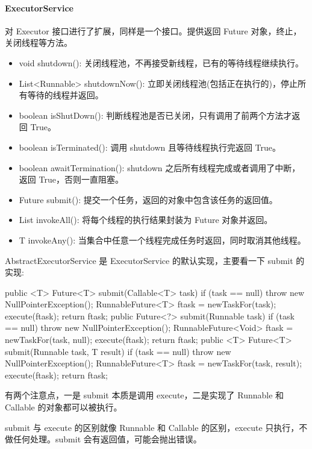 \paragraph*{ExecutorService} 对 Executor 接口进行了扩展，同样是一个接口。提供返回 Future 对象，终止，关闭线程等方法。

\begin{itemize}
    \item void shutdown(): 关闭线程池，不再接受新线程，已有的等待线程继续执行。
    \item List<Runnable> shutdownNow(): 立即关闭线程池(包括正在执行的)，停止所有等待的线程并返回。
    \item boolean isShutDown(): 判断线程池是否已关闭，只有调用了前两个方法才返回 True。
    \item boolean isTerminated(): 调用 shutdown 且等待线程执行完返回 True。
    \item boolean awaitTermination(): shutdown 之后所有线程完成或者调用了中断，返回 True，否则一直阻塞。
    \item Future submit(): 提交一个任务，返回的对象中包含该任务的返回值。
    \item List invokeAll(): 将每个线程的执行结果封装为 Future 对象并返回。
    \item T invokeAny(): 当集合中任意一个线程完成任务时返回，同时取消其他线程。
\end{itemize}

AbstractExecutorService 是 ExecutorService 的默认实现，主要看一下 submit 的实现:

\begin{Java}
public <T> Future<T> submit(Callable<T> task) {
    if (task == null) throw new NullPointerException();
    RunnableFuture<T> ftask = newTaskFor(task);
    execute(ftask);
    return ftask;
}
public Future<?> submit(Runnable task) {
    if (task == null) throw new NullPointerException();
    RunnableFuture<Void> ftask = newTaskFor(task, null);
    execute(ftask);
    return ftask;
}
public <T> Future<T> submit(Runnable task, T result) {
    if (task == null) throw new NullPointerException();
    RunnableFuture<T> ftask = newTaskFor(task, result);
    execute(ftask);
    return ftask;
}
\end{Java}

有两个注意点，一是 submit 本质是调用 execute，二是实现了 Runnable 和 Callable 的对象都可以被执行。

submit 与 execute 的区别就像 Runnable 和 Callable 的区别，execute 只执行，不做任何处理。submit 会有返回值，可能会抛出错误。 

